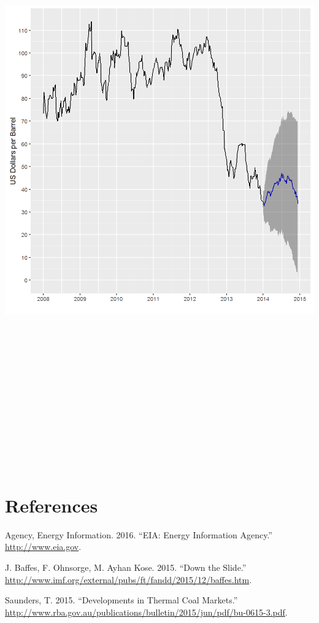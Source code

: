 \documentclass[]{article}
\begin{document}
\includegraphics[height=10.41667in]{images/EIAdata_us_crudeoil_priceforecast.png}

\newpage

\section*{References}\label{references}

\hypertarget{refs}{}
\hypertarget{ref-eia}{}
Agency, Energy Information. 2016. ``EIA: Energy Information Agency.''
\url{http://www.eia.gov}.

\hypertarget{ref-Baff2015}{}
J. Baffes, F. Ohnsorge, M. Ayhan Kose. 2015. ``Down the Slide.''
\url{http://www.imf.org/external/pubs/ft/fandd/2015/12/baffes.htm}.

\hypertarget{ref-Saun2015}{}
Saunders, T. 2015. ``Developments in Thermal Coal Markets.''
\url{http://www.rba.gov.au/publications/bulletin/2015/jun/pdf/bu-0615-3.pdf}.
\end{document}
